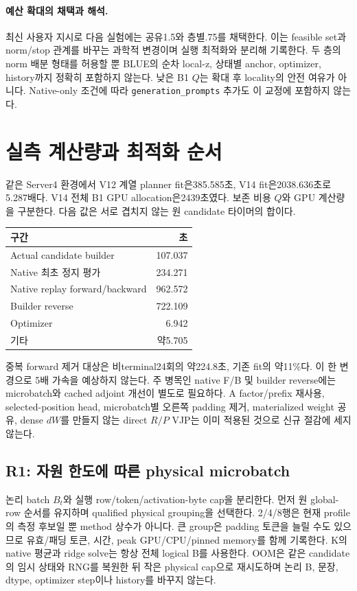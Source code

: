 \documentclass[11pt]{article}
\begin{document}
\paragraph{예산 확대의 채택과 해석.}
최신 사용자 지시로 다음 실험에는 공유1.5와 층별.75를 채택한다. 이는 feasible set과
norm/stop 관계를 바꾸는 과학적 변경이며 실행 최적화와 분리해 기록한다.
두 층의 norm 배분 형태를 허용할 뿐 BLUE의 순차
local-z, 상태별 anchor, optimizer, history까지 정확히 포함하지 않는다.
낮은 B1 $Q$는 확대 후 locality의 안전 여유가 아니다. Native-only 조건에 따라
\texttt{generation\_prompts} 추가도 이 교정에 포함하지 않는다.

\section{실측 계산량과 최적화 순서}
같은 Server4 환경에서 V12 계열 planner fit은385.585초, V14 fit은2038.636초로
5.287배다. V14 전체 B1 GPU allocation은2439초였다. 보존 비용 $Q$와 GPU 계산량을
구분한다. 다음 값은 서로 겹치지 않는 원 candidate 타이머의 합이다.
\begin{center}
\begin{tabular}{lr}
\toprule
구간 & 초\\\midrule
Actual candidate builder & 107.037\\
Native 최초 정지 평가 & 234.271\\
Native replay forward/backward & 962.572\\
Builder reverse & 722.109\\
Optimizer & 6.942\\
기타 & 약5.705\\\bottomrule
\end{tabular}
\end{center}
중복 forward 제거 대상은 비terminal24회의 약224.8초, 기존 fit의 약11\%다.
이 한 변경으로 5배 가속을 예상하지 않는다. 주 병목인 native F/B 및 builder reverse에는
microbatch와 cached adjoint 개선이 별도로 필요하다. A factor/prefix 재사용,
selected-position head, microbatch별 오른쪽 padding 제거, materialized weight 공유,
dense $dW$를 만들지 않는 direct $R/P$ VJP는 이미 적용된 것으로 신규 절감에 세지 않는다.

\subsection{R1: 자원 한도에 따른 physical microbatch}
논리 batch $B_t$와 실행 row/token/activation-byte cap을 분리한다. 먼저 원 global-row
순서를 유지하며 qualified physical grouping을 선택한다. 2/4/8행은 현재 profile의
측정 후보일 뿐 method 상수가 아니다. 큰 group은 padding 토큰을 늘릴 수도 있으므로
유효/패딩 토큰, 시간, peak GPU/CPU/pinned memory를 함께 기록한다.
K의 native 평균과 ridge solve는 항상 전체 logical B를 사용한다.
OOM은 같은 candidate의 임시 상태와 RNG를 복원한 뒤 작은 physical cap으로 재시도하며
논리 B, 문장, dtype, optimizer step이나 history를 바꾸지 않는다.
\end{document}
